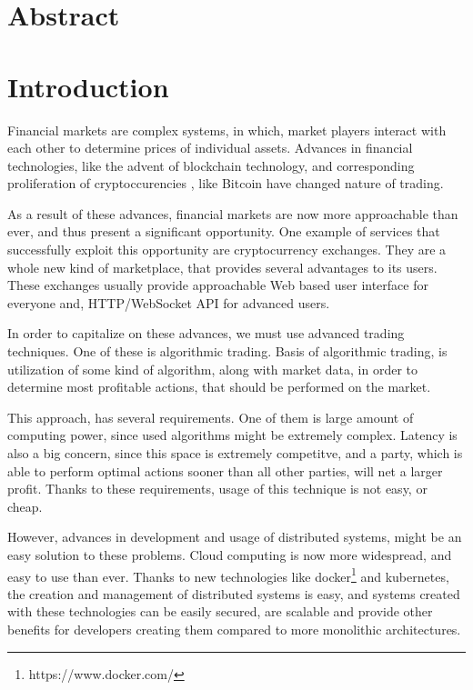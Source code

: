 \providecommand*{\listingautorefname}{Code sample}

\newcommand{\trait}[1]{{#1}}

\newcommand{\type}[1]{{#1}}
\newcommand{\fun}[1]{{#1}}
\newcommand{\kubecomp}[1]{{#1}}
\newcommand{\actor}[1]{{#1}}
\newcommand{\msg}[1]{{#1}}

\chapter*{Abstract}
\label{abstract}

\chapter{Introduction}
\label{chapter:introduction}
Financial markets are complex systems, in which, market players interact with each other to determine
prices of individual assets. Advances in financial technologies, like the advent of blockchain technology,
and corresponding proliferation of cryptoccurencies , like Bitcoin\cite{bitcoin} have changed nature of trading.

As a result of these advances, financial markets are now more approachable than ever, and thus present a significant
opportunity. One example of services that successfully exploit this opportunity are cryptocurrency exchanges. They
are a whole new kind of marketplace, that provides several advantages to its users. These exchanges usually provide
approachable Web based user interface for everyone and, HTTP/WebSocket API for advanced users.

In order to capitalize on these advances, we must use advanced trading techniques. One of these is algorithmic
trading. Basis of algorithmic trading, is utilization of some kind of algorithm, along with market data, in
order to determine most profitable actions, that should be performed on the market.

This approach, has several requirements. One of them is large amount of computing power, since used algorithms
might be extremely complex. Latency is also a big concern, since this space is extremely competitve, and a party,
which is able to perform optimal actions sooner than all other parties, will net a larger profit.
Thanks to these requirements, usage of this technique is not easy, or cheap.

However, advances in development and usage of distributed systems, might be an easy solution to these problems.
Cloud computing\cite{wiki:cloud} is now more widespread, and easy to use than ever. Thanks to new technologies like
docker\footnote{https://www.docker.com/} and kubernetes\cite{web:k8s}, the creation and management of distributed systems is easy,
and systems created with these technologies can be easily secured, are scalable and provide other benefits
for developers creating them compared to more monolithic architectures.

